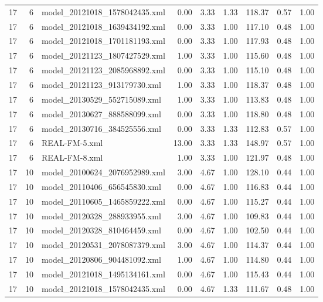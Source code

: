 \begin{table}[ht]
\begin{tabular}{rrlrrrrrr}
   17 &   6 & model\_20121018\_1578042435.xml & 0.00 & 3.33 & 1.33 & 118.37 & 0.57 & 1.00 \\ 
   17 &   6 & model\_20121018\_1639434192.xml & 0.00 & 3.33 & 1.00 & 117.10 & 0.48 & 1.00 \\ 
   17 &   6 & model\_20121018\_1701181193.xml & 0.00 & 3.33 & 1.00 & 117.93 & 0.48 & 1.00 \\ 
   17 &   6 & model\_20121123\_1807427529.xml & 1.00 & 3.33 & 1.00 & 115.60 & 0.48 & 1.00 \\ 
   17 &   6 & model\_20121123\_2085968892.xml & 0.00 & 3.33 & 1.00 & 115.10 & 0.48 & 1.00 \\ 
   17 &   6 & model\_20121123\_913179730.xml & 1.00 & 3.33 & 1.00 & 118.37 & 0.48 & 1.00 \\ 
   17 &   6 & model\_20130529\_552715089.xml & 1.00 & 3.33 & 1.00 & 113.83 & 0.48 & 1.00 \\ 
   17 &   6 & model\_20130627\_888588099.xml & 0.00 & 3.33 & 1.00 & 118.80 & 0.48 & 1.00 \\ 
   17 &   6 & model\_20130716\_384525556.xml & 0.00 & 3.33 & 1.33 & 112.83 & 0.57 & 1.00 \\ 
   17 &   6 & REAL-FM-5.xml & 13.00 & 3.33 & 1.33 & 148.97 & 0.57 & 1.00 \\ 
   17 &   6 & REAL-FM-8.xml & 1.00 & 3.33 & 1.00 & 121.97 & 0.48 & 1.00 \\ 
   17 &  10 & model\_20100624\_2076952989.xml & 3.00 & 4.67 & 1.00 & 128.10 & 0.44 & 1.00 \\ 
   17 &  10 & model\_20110406\_656545830.xml & 0.00 & 4.67 & 1.00 & 116.83 & 0.44 & 1.00 \\ 
   17 &  10 & model\_20110605\_1465859222.xml & 0.00 & 4.67 & 1.00 & 115.27 & 0.44 & 1.00 \\ 
   17 &  10 & model\_20120328\_288933955.xml & 3.00 & 4.67 & 1.00 & 109.83 & 0.44 & 1.00 \\ 
   17 &  10 & model\_20120328\_810464459.xml & 0.00 & 4.67 & 1.00 & 102.50 & 0.44 & 1.00 \\ 
   17 &  10 & model\_20120531\_2078087379.xml & 3.00 & 4.67 & 1.00 & 114.37 & 0.44 & 1.00 \\ 
   17 &  10 & model\_20120806\_904481092.xml & 1.00 & 4.67 & 1.00 & 114.80 & 0.44 & 1.00 \\ 
   17 &  10 & model\_20121018\_1495134161.xml & 0.00 & 4.67 & 1.00 & 115.43 & 0.44 & 1.00 \\ 
   17 &  10 & model\_20121018\_1578042435.xml & 0.00 & 4.67 & 1.33 & 111.67 & 0.48 & 1.00 \\ 

\end{tabular}
\end{table}
